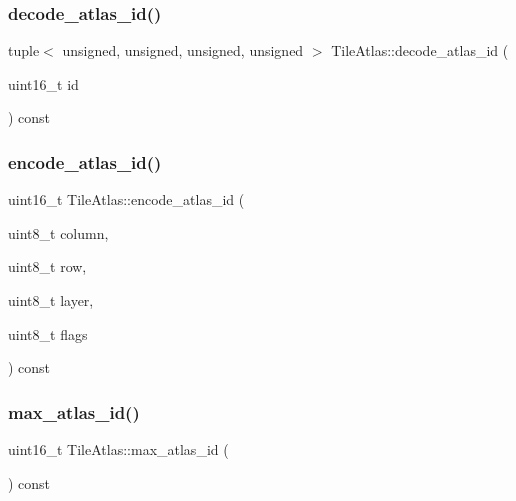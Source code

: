 \subsubsection{\texorpdfstring{decode\+\_\+atlas\+\_\+id()}{decode\_atlas\_id()}}
{\footnotesize\ttfamily tuple$<$ unsigned, unsigned, unsigned, unsigned $>$ Tile\+Atlas\+::decode\+\_\+atlas\+\_\+id (\begin{DoxyParamCaption}\item[{uint16\+\_\+t}]{id }\end{DoxyParamCaption}) const}

\mbox{\label{classpixel_1_1_tile_atlas_a2c82229d33fecdcc42acde2f483961d4}} 
\subsubsection{\texorpdfstring{encode\+\_\+atlas\+\_\+id()}{encode\_atlas\_id()}}
{\footnotesize\ttfamily uint16\+\_\+t Tile\+Atlas\+::encode\+\_\+atlas\+\_\+id (\begin{DoxyParamCaption}\item[{uint8\+\_\+t}]{column,  }\item[{uint8\+\_\+t}]{row,  }\item[{uint8\+\_\+t}]{layer,  }\item[{uint8\+\_\+t}]{flags }\end{DoxyParamCaption}) const}

\mbox{\label{classpixel_1_1_tile_atlas_a47522bb62a8025d9354ee73f1c47dea8}} 
\subsubsection{\texorpdfstring{max\+\_\+atlas\+\_\+id()}{max\_atlas\_id()}}
{\footnotesize\ttfamily uint16\+\_\+t Tile\+Atlas\+::max\+\_\+atlas\+\_\+id (\begin{DoxyParamCaption}{ }\end{DoxyParamCaption}) const}

